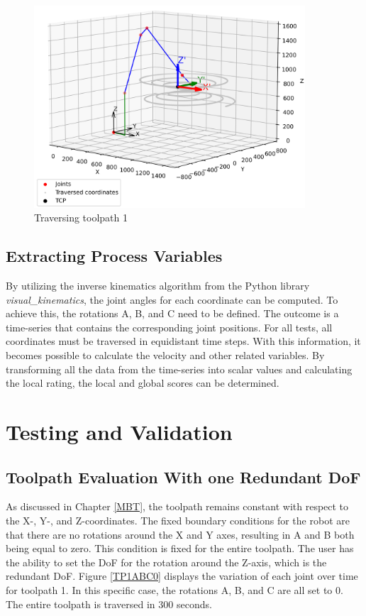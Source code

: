 \begin{figure}[H]
	\centerline{\includegraphics[width=0.9\textwidth]{figures/robotANDpath1.png}}
	\caption{Traversing toolpath 1}
	\label{TP1robot}
\end{figure}




\subsection{Extracting Process Variables}
By utilizing the inverse kinematics algorithm from the Python library \textit{visual\_kinematics}, the joint angles for each coordinate can be computed. To achieve this, the rotations A, B, and C need to be defined. The outcome is a time-series that contains the corresponding joint positions. For all tests, all coordinates must be traversed in equidistant time steps. With this information, it becomes possible to calculate the velocity and other related variables. By transforming all the data from the time-series into scalar values and calculating the local rating, the local and global scores can be determined.
\newpage
\section{Testing and Validation}%

\subsection{Toolpath Evaluation With one Redundant DoF}
As discussed in Chapter \ref{MBT}, the toolpath remains constant with respect to the X-, Y-, and Z-coordinates. The fixed boundary conditions for the robot are that there are no rotations around the X and Y axes, resulting in A and B both being equal to zero. This condition is fixed for the entire toolpath. The user has the ability to set the \acrshort{DoF} for the rotation around the Z-axis, which is the redundant \acrshort{DoF}. Figure \ref{TP1ABC0} displays the variation of each joint over time for toolpath 1. In this specific case, the rotations A, B, and C are all set to 0. The entire toolpath is traversed in 300 seconds.

